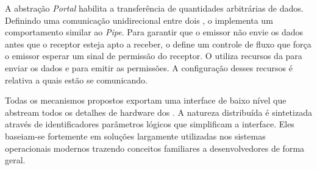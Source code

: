 	A abstração \textit{Portal} habilita a transferência de quantidades
	arbitrárias de dados. Definindo uma comunicação unidirecional entre dois
	\clusters, o \portal implementa um comportamento similar ao \posix
	\textit{Pipe}. Para garantir que o emissor não envie os dados antes que
	o receptor esteja apto a receber, o \portal define um controle de fluxo
	que força o emissor esperar um sinal de permissão do receptor.
	O \portal utiliza recursos da \dnoc para enviar os dados e \cnoc para
	emitir as permissões. A configuração desses recursos é relativa a quais
	\clusters estão se comunicando.

	Todas os mecanismos propostos exportam uma interface de baixo nível que
	abstream todos os detalhes de hardware dos \lws. A natureza distribuída
	é sintetizada através de identificadores parâmetros lógicos que simplificam
	a interface. Eles baseiam-se fortemente em soluções largamente utilizadas nos
	sistemas operacionais modernos trazendo conceitos familiares a desenvolvedores
	de forma geral.

